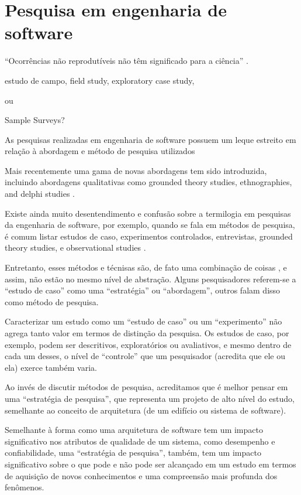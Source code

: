 \section{Pesquisa em engenharia de software}
{``Ocorrências não reprodutíveis não têm significado para a ciência'' \cite{popper2004logica}.}


estudo de campo, field study, exploratory case study,

ou

Sample Surveys?

As pesquisas realizadas em engenharia de software possuem um leque estreito em
relação à abordagem e método de pesquisa utilizados  \cite{glass2002research}

Mais recentemente uma gama de novas abordagens tem sido introduzida, incluindo
abordagens qualitativas como grounded theory studies, ethnographies, and delphi
studies \cite{hazzan2010qualitative}.

Existe ainda muito desentendimento e confusão sobre a termilogia em pesquisas
da engenharia de software, por exemplo, quando se fala em métodos de pesquisa,
é comum listar estudos de caso, experimentos controlados, entrevistas, grounded
theory studies, e observational studies \cite{hazzan2010qualitative}.

Entretanto, esses métodos e técnisas são, de fato uma combinação de coisas
\cite{mcgrath1981dilemmatics}, e assim, não estão no mesmo nível de abstração.
Alguns pesquisadores referem-se a ``estudo de caso'' como uma ``estratégia'' ou
``abordagem'', outros falam disso como método de pesquisa.

Caracterizar um estudo como um ``estudo de caso'' ou um ``experimento'' não
agrega tanto valor em termos de distinção da pesquisa. Os
estudos de caso, por exemplo, podem ser descritivos, exploratórios ou
avaliativos, e mesmo dentro de cada um desses, o nível de ``controle'' que um
pesquisador (acredita que ele ou ela) exerce também varia.

Ao invés de discutir
métodos de pesquisa, acreditamos que é melhor pensar em uma ``estratégia de
pesquisa'', que representa um projeto de alto nível do estudo, semelhante ao
conceito de arquitetura (de um edifício ou sistema de software).

Semelhante à
forma como uma arquitetura de software tem um impacto significativo nos
atributos de qualidade de um sistema, como desempenho e confiabilidade, uma
``estratégia de pesquisa'', também, tem um impacto significativo sobre o que pode e
não pode ser alcançado em um estudo em termos de aquisição de novos
conhecimentos e uma compreensão mais profunda dos fenômenos.

